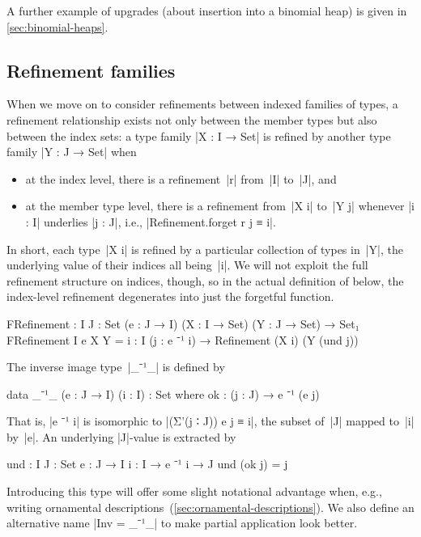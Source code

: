 
A further example of upgrades (about insertion into a binomial heap) is given in \autoref{sec:binomial-heaps}.

\subsection{Refinement families}
\label{sec:refinement-families}

When we move on to consider refinements between indexed families of types, a refinement relationship exists not only between the member types but also between the index sets: a type family |X : I → Set| is refined by another type family |Y : J → Set| when
\begin{itemize}
\item at the index level, there is a refinement~|r| from~|I| to~|J|, and
\item at the member type level, there is a refinement from~|X i| to~|Y j| whenever |i : I| underlies |j : J|, i.e., |Refinement.forget r j ≡ i|.
\end{itemize}
In short, each type~|X i| is refined by a particular collection of types in~|Y|, the underlying value of their indices all being~|i|.
We will not exploit the full refinement structure on indices, though, so in the actual definition of  below, the index-level refinement degenerates into just the forgetful function.
\begin{code}
FRefinement : {I J : Set} (e : J → I) (X : I → Set) (Y : J → Set) → Set₁
FRefinement {I} e X Y = {i : I} (j : e ⁻¹ i) → Refinement (X i) (Y (und j))
\end{code}
The inverse image type~|_⁻¹_| is defined by
\begin{code}
data _⁻¹_ (e : J → I) (i : I) : Set where
  ok : (j : J) → e ⁻¹ (e j)
\end{code}
That is, |e ⁻¹ i| is isomorphic to |(Σ'(j ∶ J)) e j ≡ i|, the subset of~|J| mapped to~|i| by~|e|.
An underlying |J|-value is extracted by
\begin{code}
und : {I J : Set} {e : J → I} {i : I} → e ⁻¹ i → J
und (ok j) = j
\end{code}
Introducing this type will offer some slight notational advantage when, e.g., writing ornamental descriptions~(\autoref{sec:ornamental-descriptions}).
We also define an alternative name |Inv = _⁻¹_| to make partial application look better.

